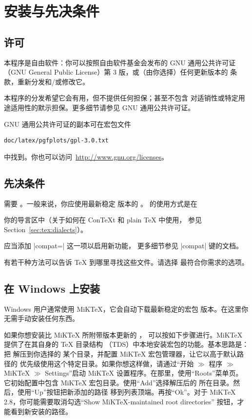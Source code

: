 
\section{安装与先决条件}

\subsection{许可}

本程序是自由软件：你可以按照自由软件基金会发布的 GNU 通用公共许可证
（GNU General Public License）第 3 版，或（由你选择）任何更新版本的
条款，重新分发和/或修改它。

本程序的分发希望它会有用，但不提供任何担保；甚至不包含
对适销性或特定用途适用性的默示担保。更多细节请参见 GNU 通用公共许可证。

GNU 通用公共许可证的副本可在宏包文件
%
\begin{verbatim}
doc/latex/pgfplots/gpl-3.0.txt
\end{verbatim}
%
中找到。你也可以访问~\url{http://www.gnu.org/licenses}。


\subsection{先决条件}

\PGFPlots{} 需要 \PGF{}。一般来说，你应使用最新稳定
版本的 \PGF{}。\PGFPlots{} 的使用方式是在
%

%
\noindent 你的导言区中（关于如何在 Con\TeX{}t 和 plain \TeX{} 中使用，
参见 Section~\ref{sec:tex:dialects}）。

应当添加 |compat=| 这一项以启用新功能，
更多细节参见 |compat| 键的文档。



有若干种方法可以告诉 \TeX{} 到哪里寻找这些文件。请选择
最符合你需求的选项。


\subsection{在 Windows 上安装}

Windows 用户通常使用 MiK\TeX{}，它会自动下载最新稳定的宏包
版本。在这里你无需手动安装任何东西。

如果你想安装比 MiK\TeX{} 所附带版本更新的 \PGFPlots{}，
可以按如下步骤进行。MiK\TeX{} 提供了在其自身的 \TeX{} 目录结构
（TDS）中本地安装宏包的功能。基本思路是：把 \PGFPlots{} 解压到你选择的
某个目录，并配置 MiK\TeX{} 宏包管理器，让它以高于默认路径的
优先级使用这个特定目录。如果你想这样做，请通过“开始 $\gg$ 程序 $\gg$ MiK\TeX{} $\gg$
Settings”启动 MiK\TeX{} 设置程序。在那里，使用“Roots”菜单页。
它初始配置中包含 MiK\TeX{} 宏包目录。使用“Add”选择解压后的
\PGFPlots{} 所在目录。然后，使用“Up”按钮把新添加的路径
移到列表顶端。再按“Ok”。对于 MiK\TeX{}
2.8，你可能需要取消勾选“Show MiK\TeX{}-maintained root directories”
按钮，才能看到新安装的路径。

